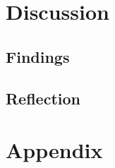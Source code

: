 \documentclass[titlepage]{article}
\begin{document}
\section{Discussion}

\subsection{Findings}

\subsection{Reflection}

\section{Appendix}
\end{document}

